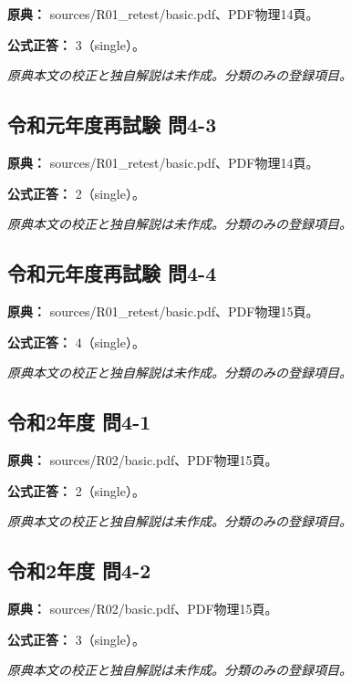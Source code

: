 \noindent\textbf{原典：} sources/R01\_retest/basic.pdf、PDF物理14頁。

\textbf{公式正答：} 3（single）。

\par\textit{原典本文の校正と独自解説は未作成。分類のみの登録項目。}

\subsection{令和元年度再試験 問4-3}
\label{q:r01-ret-basic-4-3}

\noindent\textbf{原典：} sources/R01\_retest/basic.pdf、PDF物理14頁。

\textbf{公式正答：} 2（single）。

\par\textit{原典本文の校正と独自解説は未作成。分類のみの登録項目。}

\subsection{令和元年度再試験 問4-4}
\label{q:r01-ret-basic-4-4}

\noindent\textbf{原典：} sources/R01\_retest/basic.pdf、PDF物理15頁。

\textbf{公式正答：} 4（single）。

\par\textit{原典本文の校正と独自解説は未作成。分類のみの登録項目。}

\subsection{令和2年度 問4-1}
\label{q:r02-reg-basic-4-1}

\noindent\textbf{原典：} sources/R02/basic.pdf、PDF物理15頁。

\textbf{公式正答：} 2（single）。

\par\textit{原典本文の校正と独自解説は未作成。分類のみの登録項目。}

\subsection{令和2年度 問4-2}
\label{q:r02-reg-basic-4-2}

\noindent\textbf{原典：} sources/R02/basic.pdf、PDF物理15頁。

\textbf{公式正答：} 3（single）。

\par\textit{原典本文の校正と独自解説は未作成。分類のみの登録項目。}


